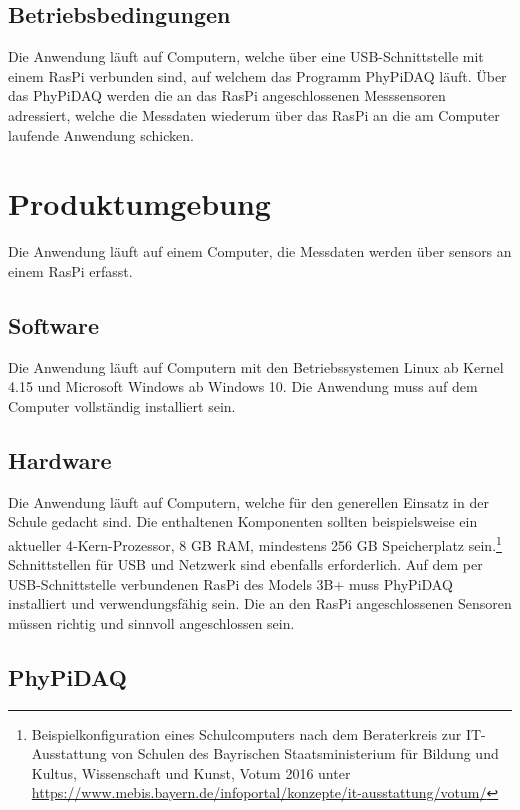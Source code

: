 \documentclass[parskip=full]{scrartcl}
\begin{document}
\subsection{Betriebsbedingungen}

Die Anwendung läuft auf Computern, welche über eine USB-Schnittstelle mit einem \gls{RasPi} verbunden sind, auf welchem das Programm \gls{PhyPiDAQ} läuft. Über das \gls{PhyPiDAQ} werden die an das \gls{RasPi} angeschlossenen Messsensoren adressiert, welche die Messdaten wiederum über das \gls{RasPi} an die am Computer laufende Anwendung schicken. 


\clearpage
\section{Produktumgebung}\label{produktumgebung}

Die Anwendung läuft auf einem Computer, die Messdaten werden über \glspl{sensor} an einem \gls{RasPi} erfasst.

\subsection{Software}

Die Anwendung läuft auf Computern mit den Betriebssystemen Linux ab Kernel 4.15 und Microsoft Windows ab Windows 10. Die Anwendung muss auf dem Computer vollständig installiert sein. 

\subsection{Hardware}

Die Anwendung läuft auf Computern, welche für den generellen Einsatz in der Schule gedacht sind.
Die enthaltenen Komponenten sollten beispielsweise ein aktueller 4-Kern-Prozessor, 8 GB RAM,
mindestens 256 GB Speicherplatz sein.\footnote{Beispielkonfiguration eines Schulcomputers nach dem Beraterkreis zur IT-Ausstattung von Schulen des Bayrischen Staatsministerium für Bildung und Kultus, Wissenschaft und Kunst, Votum 2016 unter \url{https://www.mebis.bayern.de/infoportal/konzepte/it-ausstattung/votum/}} Schnittstellen für USB und Netzwerk sind ebenfalls erforderlich. 
Auf dem per USB-Schnittstelle verbundenen \gls{RasPi} des Models 3B+ muss \gls{PhyPiDAQ} installiert und verwendungsfähig sein.
Die an den \gls{RasPi} angeschlossenen Sensoren müssen richtig und sinnvoll angeschlossen sein.

\subsection{PhyPiDAQ}
\end{document}
